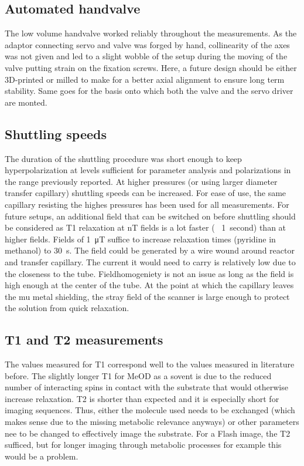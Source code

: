         \subsection{Automated handvalve}
            The low volume handvalve worked reliably throughout the measurements. As the adaptor connecting servo and valve was forged by hand, collinearity of the axes was not given and led to a slight wobble of the setup during the moving of the valve putting strain on the fixation screws. Here, a future design should be either 3D-printed or milled to make for a better axial alignment to ensure long term stability. Same goes for the basis onto which both the valve and the servo driver are monted. 
        \subsection{Shuttling speeds}
            The duration of the shuttling procedure was short enough to keep hyperpolarization at levels sufficient for parameter analysis and polarizations in the range previously reported. At higher pressures (or using larger diameter transfer capillary) shuttling speeds can be increased. For ease of use, the same capillary resisting the highes pressures has been used for all measurements. For future setups, an additional field that can be switched on before shuttling should be considered as T1 relaxation at \si{\nano\tesla} fields is a lot faster (~ \SI{1}{second}) than at higher fields. Fields of \SI{1}{\micro\tesla} suffice to increase relaxation times (pyridine in methanol) to \SI{30}{\second}. The field could be generated by a wire wound around reactor and transfer capillary. The current it would need to carry is relatively low due to the closeness to the tube. Fieldhomogeniety is not an issue as long as the field is high enough at the center of the tube. At the point at which the capillary leaves the mu metal shielding, the stray field of the scanner is large enough to protect the solution from quick relaxation.
        \subsection{T1 and T2 measurements}
        The values measured for T1 correspond well to the values measured in literature before. The slightly longer T1 for MeOD as a sovent is due to the reduced number of interacting spins in contact with the substrate that would otherwise increase relaxation. T2 is shorter than expected and it is especially short for imaging sequences. Thus, either the molecule used needs to be exchanged (which makes sense due to the missing metabolic relevance anyways) or other parameters nee to be changed to effectively image the substrate. For a Flash image, the T2 sufficed, but for longer imaging through metabolic processes for example this would be a problem.
